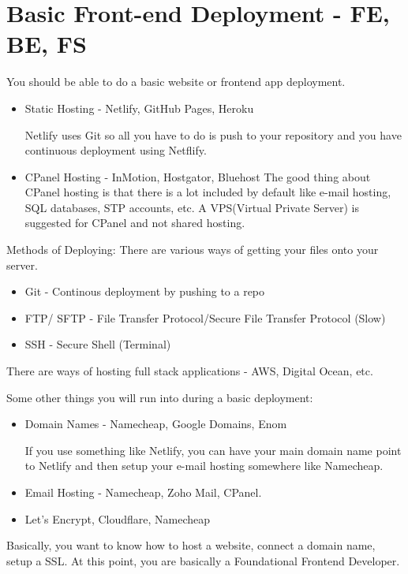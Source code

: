 \section{Basic Front-end Deployment - FE, BE, FS}
You should be able to do a basic website or frontend app deployment.
\begin{itemize}
    \item Static Hosting - Netlify, GitHub Pages, Heroku

    Netlify uses Git so all you have to do is push to your repository and you have continuous deployment using Netflify.
    \item CPanel Hosting - InMotion, Hostgator, Bluehost
    The good thing about CPanel hosting is that there is a lot included by default like e-mail hosting, SQL databases, STP accounts, etc. A VPS(Virtual Private Server) is suggested for CPanel and not shared hosting. 
\end{itemize}

Methods of Deploying:
There are various ways of getting your files onto your server.
\begin{itemize}
    \item Git - Continous deployment by pushing to a repo
    \item FTP/ SFTP - File Transfer Protocol/Secure File Transfer Protocol (Slow)
    \item SSH - Secure Shell (Terminal)
\end{itemize}
There are ways of hosting full stack applications - AWS, Digital Ocean, etc.

Some other things you will run into during a basic deployment: 
\begin{itemize}
    \item Domain Names - Namecheap, Google Domains, Enom
    
    If you use something like Netlify, you can have your main domain name point to Netlify and then setup your e-mail hosting somewhere like Namecheap.
    \item Email Hosting - Namecheap, Zoho Mail, CPanel.
    \item Let's Encrypt, Cloudflare, Namecheap
\end{itemize}

Basically, you want to know how to host a website, connect a domain name, setup a SSL. At this point, you are basically a Foundational Frontend Developer.

